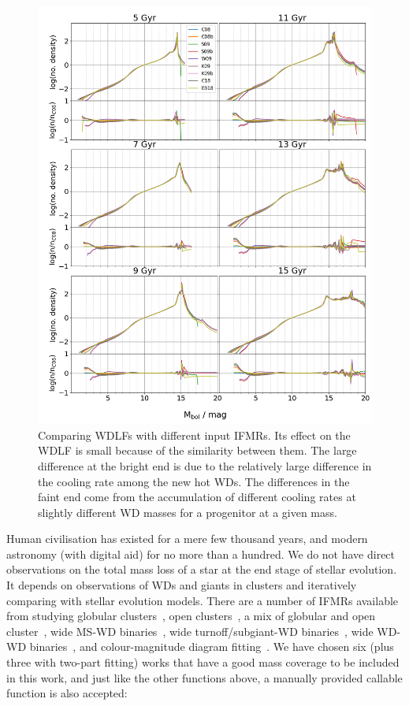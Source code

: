 \documentclass[fleqn,usenatbib]{rasti}
\begin{document}
\begin{figure}
    \centering
    \includegraphics[width=\textwidth]{fig_11_wdlf_compare_ifmr.png}
    \caption{Comparing WDLFs with different input IFMRs. Its effect on the WDLF
    is small because of the similarity between them. The large difference at
    the bright end is due to the relatively large difference in the cooling
    rate among the new hot WDs. The differences in the faint end come from the
    accumulation of different cooling rates at slightly different WD masses for
    a progenitor at a given mass.}
    \label{fig:wdlf_compare_ifmr}
\end{figure}

Human civilisation has existed for a mere few thousand years, and modern
astronomy (with digital aid) for no more than a hundred. We
do not have direct observations on the total mass loss of a star at the end
stage of stellar evolution. It depends on observations of WDs and giants in
clusters and iteratively comparing with stellar evolution models. There are a
number of IFMRs available from studying globular
clusters~\citep{2004A&A...420..515M, 2009ApJ...705..408K}, open
clusters~\citep{2009ApJ...693..355W, 2016ApJ...818...84C}, a mix of globular
and open cluster~\citep{2018ApJ...866...21C}, wide MS-WD
binaries~\citep{2008A&A...477..213C, 2012ApJ...746..144Z}, wide
turnoff/subgiant-WD binaries~\citep{2021ApJ...923..181B}, wide WD-WD
binaries~\citep{2015ASPC..493..325C, 2015ApJ...815...63A}, and colour-magnitude
diagram fitting~\citep{2018ApJ...860L..17E}. We have chosen six (plus three
with two-part fitting) works that have a good mass coverage to be included
in this work, and just like the other functions above, a manually provided
callable function is also accepted:
\end{document}

